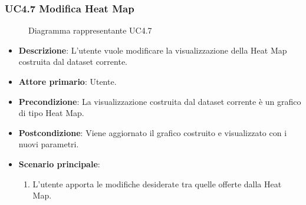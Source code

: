 \newpage
\subsubsection{UC4.7 Modifica Heat Map}
\label{ssub:uc4.7}
\begin{figure}[h]
    \centering
    \caption{Diagramma rappresentante UC4.7}
    \label{fig:UC4.7}
\end{figure}


\begin{itemize}
    \item \textbf{Descrizione}: L’utente vuole modificare la visualizzazione della Heat Map
                                costruita dal dataset corrente.
	
    \item \textbf{Attore primario}: Utente.
    
    \item \textbf{Precondizione}:   La visualizzazione costruita dal dataset corrente è un grafico di tipo Heat Map.

    \item \textbf{Postcondizione}:  Viene aggiornato il grafico costruito e visualizzato con i nuovi parametri.

	\item \textbf{Scenario principale}:
		\begin{enumerate}
            \item L'utente apporta le modifiche desiderate tra quelle offerte dalla Heat Map.
        \end{enumerate}
\end{itemize}

